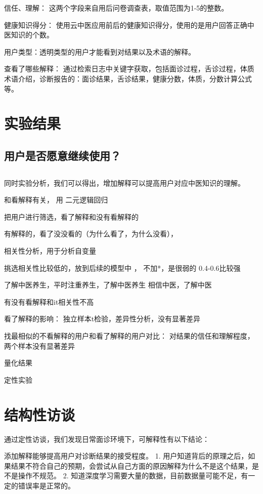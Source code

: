 信任、理解： 这两个字段来自用后问卷调查表，取值范围为1-5的整数。

健康知识得分： 使用云中医应用前后的健康知识得分，使用的是用户回答正确中医知识的个数。

用户类型：透明类型的用户才能看到对结果以及术语的解释。

查看了哪些解释： 通过检索日志中关键字获取，包括面诊过程，舌诊过程，体质术语介绍，诊断报告的：面诊结果，舌诊结果，健康分数，体质，分数计算公式等。

\section{实验结果}

\subsection{用户是否愿意继续使用？}

\subsection{}

同时实验分析，我们可以得出，增加解释可以提高用户对应中医知识的理解。

和看解释有关， 用 二元逻辑回归

把用户进行筛选，看了解释和没有看解释的

有解释的，看了没没看的（为什么看了，为什么没看）， 

相关性分析，用于分析自变量

挑选相关性比较低的，放到后续的模型中 ， 不加*，是很弱的 0.4-0.6比较强

了解中医养生，平时注重养生，了解中医养生
相信中医，了解中医

有没有看解释和it相关性不高

看了解释的影响：
独立样本t检验，差异性分析，没有显著差异

找最相似的不看解释的用户和看了解释的用户对比： 
对结果的信任和理解程度，两个样本没有显著差异



量化结果

定性实验

\section{结构性访谈}

通过定性访谈，我们发现日常面诊环境下，可解释性有以下结论：

添加解释能够提高用户对诊断结果的接受程度。
1. 用户知道背后的原理之后，如果结果不符合自己的预期，会尝试从自己方面的原因解释为什么不是这个结果，是不是操作不规范。
2. 知道深度学习需要大量的数据，目前数据量可能不足，有一定的错误率是正常的。

